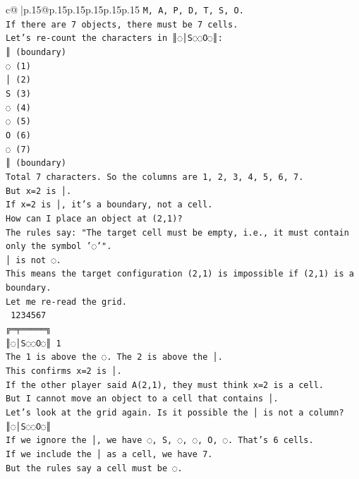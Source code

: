 \documentclass{article}
\begin{document}
{\begin{supertabular}{c@{$\;$}|p{.15\linewidth}@{}p{.15\linewidth}p{.15\linewidth}p{.15\linewidth}p{.15\linewidth}p{.15\linewidth}}
{{{\texttt{M, A, P, D, T, S, O.} \\
\texttt{If there are 7 objects, there must be 7 cells.} \\
\texttt{Let's re{-}count the characters in ║◌│S◌◌O◌║:} \\
\texttt{║ (boundary)} \\
\texttt{◌ (1)} \\
\texttt{│ (2)} \\
\texttt{S (3)} \\
\texttt{◌ (4)} \\
\texttt{◌ (5)} \\
\texttt{O (6)} \\
\texttt{◌ (7)} \\
\texttt{║ (boundary)} \\
\texttt{Total 7 characters. So the columns are 1, 2, 3, 4, 5, 6, 7.} \\
\texttt{But x=2 is │.} \\
\texttt{If x=2 is │, it's a boundary, not a cell.} \\
\texttt{How can I place an object at (2,1)?} \\
\texttt{The rules say: "The target cell must be empty, i.e., it must contain only the symbol '◌'".} \\
\texttt{│ is not ◌.} \\
\texttt{This means the target configuration (2,1) is impossible if (2,1) is a boundary.} \\
\texttt{Let me re{-}read the grid.} \\
\texttt{ 1234567} \\
\texttt{╔═╤═════╗} \\
\texttt{║◌│S◌◌O◌║ 1} \\
\texttt{The 1 is above the ◌. The 2 is above the │.} \\
\texttt{This confirms x=2 is │.} \\
\texttt{If the other player said A(2,1), they must think x=2 is a cell.} \\
\texttt{But I cannot move an object to a cell that contains │.} \\
\texttt{Let's look at the grid again. Is it possible the │ is not a column?} \\
\texttt{║◌│S◌◌O◌║} \\
\texttt{If we ignore the │, we have ◌, S, ◌, ◌, O, ◌. That's 6 cells.} \\
\texttt{If we include the │ as a cell, we have 7.} \\
\texttt{But the rules say a cell must be ◌.} \\
}}}
\end{supertabular}}
\end{document}
